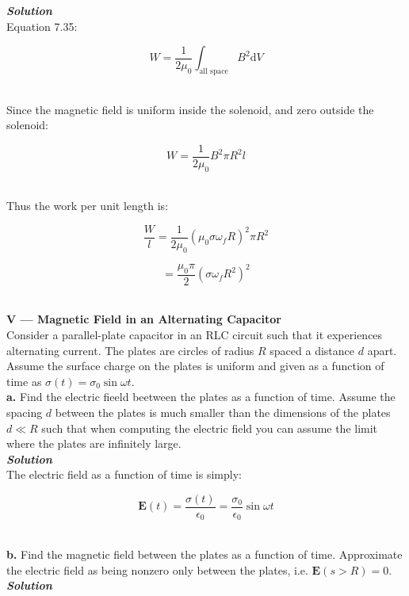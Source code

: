 \documentclass[9pt]{extarticle}
\renewcommand{\v}[1]{{\bm #1}}
\newcommand{\bfit}[1]{\textbf{\textit{#1}}}
\renewcommand{\d}{\text{d}}
\newcommand{\eo}{\epsilon_0}
\newcommand{\muo}{\mu_0}
\begin{document}
\begin{multicols*}{2}
{\bfit{Solution}} \\ 

Equation 7.35:

$$W = \frac{1}{2\muo} \int_{\text{all space}} B^2 \d V$$ \ 

Since the magnetic field is uniform inside the solenoid, and zero outside the solenoid:

$$W = \frac{1}{2\muo} B^2 \pi R^2 l$$ \ 

Thus the work per unit length is:

$$\frac Wl = \frac{1}{2\muo} (\muo \sigma\omega_f R)^2 \pi R^2$$ 

$$= \frac{\muo \pi}{2} (\sigma\omega_f R^2)^2$$ \ 






\hrulefill 

\hfill 

{\LARGE \bf V --- Magnetic Field in an Alternating Capacitor} \\ 

Consider a parallel-plate capacitor in an RLC circuit such that it experiences alternating current. The plates are circles of radius $R$ spaced a distance $d$ apart. Assume the surface charge on the plates is uniform and given as a function of time as $\sigma(t) = \sigma_0\sin\omega t$.  \\ 

{\Large \bf a.} Find the electric fieeld beetween the plates as a function of time. Assume the spacing $d$ between the plates is much smaller than the dimensions of the plates $ d \ll R$ such that when computing the electric field you can assume the limit where the plates are infinitely large. \\ 

{\bfit{Solution}}  \\ 

The electric field as a function of time is simply: 

$$\v E(t) = \frac{\sigma(t)}{\eo} = \frac{\sigma_0}{\eo} \sin\omega t$$ \ 




\dotfill 

\hfill 

{\Large \bf b.} Find the magnetic field between the plates as a function  of time. Approximate the electric field as being nonzero only between the plates, i.e. $\v E (s>R) = 0$.  \\  

{\bfit{Solution}}  \\ 


\end{multicols*}
\end{document}
